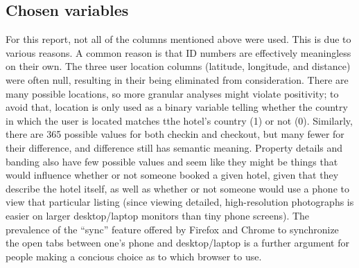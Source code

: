 \documentclass{article}
\begin{document}
\subsection{Chosen variables}


For this report, not all of the columns mentioned above were used.  This is due
to various reasons.  A common reason is that ID numbers are effectively
meaningless on their own.  The three user location columns (latitude, longitude,
and distance) were often null, resulting in their being eliminated from
consideration.  There are many possible locations, so more granular analyses
might violate positivity; to avoid that, location is only used as a binary
variable telling whether the country in which the user is located matches tthe
hotel's country (1) or not (0).  Similarly, there are 365 possible values for
both checkin and checkout, but many fewer for their difference, and difference
still has semantic meaning.  Property details and banding also have few possible
values and seem like they might be things that would influence whether or not
someone booked a given hotel, given that they describe the hotel itself, as well
as whether or not someone would use a phone to view that particular listing
(since viewing detailed, high-resolution photographs is easier on larger
desktop/laptop monitors than tiny phone screens).  The prevalence of the
``sync'' feature offered by Firefox and Chrome to synchronize the open tabs
between one's phone and desktop/laptop is a further argument for people making a
concious choice as to which browser to use.
\end{document}
